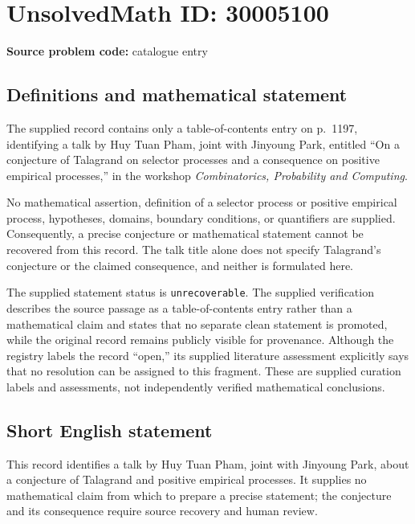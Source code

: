\documentclass[11pt]{article}
\begin{document}
\section*{UnsolvedMath ID: 30005100}
\textbf{Source problem code:} catalogue entry
\subsection{Definitions and mathematical statement}
The supplied record contains only a table-of-contents entry on p.~1197, identifying a talk by Huy Tuan Pham, joint with Jinyoung Park, entitled ``On a conjecture of Talagrand on selector processes and a consequence on positive empirical processes,'' in the workshop \emph{Combinatorics, Probability and Computing}.

No mathematical assertion, definition of a selector process or positive empirical process, hypotheses, domains, boundary conditions, or quantifiers are supplied. Consequently, a precise conjecture or mathematical statement cannot be recovered from this record. The talk title alone does not specify Talagrand's conjecture or the claimed consequence, and neither is formulated here.

The supplied statement status is \texttt{unrecoverable}. The supplied verification describes the source passage as a table-of-contents entry rather than a mathematical claim and states that no separate clean statement is promoted, while the original record remains publicly visible for provenance. Although the registry labels the record ``open,'' its supplied literature assessment explicitly says that no resolution can be assigned to this fragment. These are supplied curation labels and assessments, not independently verified mathematical conclusions.
\subsection{Short English statement}
This record identifies a talk by Huy Tuan Pham, joint with Jinyoung Park, about a conjecture of Talagrand and positive empirical processes. It supplies no mathematical claim from which to prepare a precise statement; the conjecture and its consequence require source recovery and human review.
\end{document}
